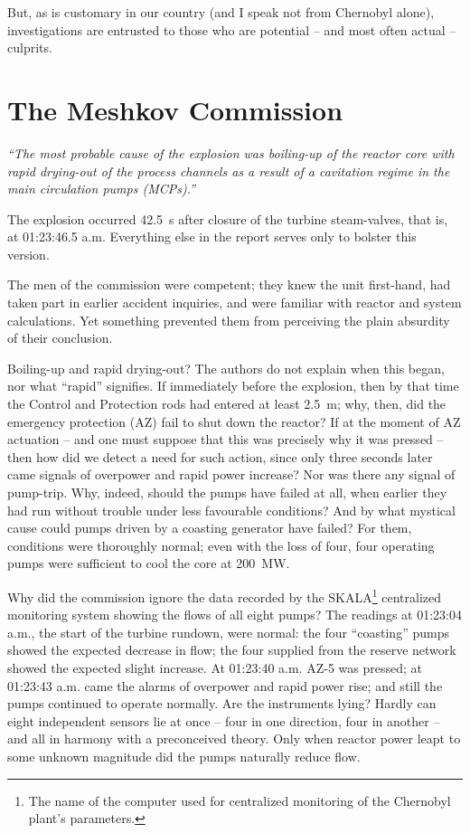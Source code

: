 \documentclass[openright]{bookest}
\begin{document}
But, as is customary in our country (and I speak not from Chernobyl alone), investigations are entrusted to those who are potential -- and most often actual -- culprits.

\section{The Meshkov Commission}

\begin{personal}
\textit{``The most probable cause of the explosion was boiling-up of the reactor core with rapid drying-out of the process channels as a result of a cavitation regime in the main circulation pumps (MCPs).''}
\end{personal}

The explosion occurred \qty{42.5}{\second} after closure of the turbine steam-valves, that is, at 01:23:46.5 a.m. Everything else in the report serves only to bolster this version.

The men of the commission were competent; they knew the unit first-hand, had taken part in earlier accident inquiries, and were familiar with reactor and system calculations. Yet something prevented them from perceiving the plain absurdity of their conclusion.

Boiling-up and rapid drying-out? The authors do not explain when this began, nor what ``rapid'' signifies. If immediately before the explosion, then by that time the Control and Protection rods had entered at least \qty{2.5}{\metre}; why, then, did the emergency protection (AZ) fail to shut down the reactor? If at the moment of AZ actuation -- and one must suppose that this was precisely why it was pressed -- then how did we detect a need for such action, since only three seconds later came signals of overpower and rapid power increase? Nor was there any signal of pump-trip. Why, indeed, should the pumps have failed at all, when earlier they had run without trouble under less favourable conditions? And by what mystical cause could pumps driven by a coasting generator have failed? For them, conditions were thoroughly normal; even with the loss of four, four operating pumps were sufficient to cool the core at \qty{200}{\mega\watt}.

Why did the commission ignore the data recorded by the SKALA\footnote{The name of the computer used for centralized monitoring of the Chernobyl plant's parameters.} centralized monitoring system showing the flows of all eight pumps? The readings at 01:23:04 a.m., the start of the turbine rundown, were normal: the four ``coasting'' pumps showed the expected decrease in flow; the four supplied from the reserve network showed the expected slight increase. At 01:23:40 a.m. AZ-5 was pressed; at 01:23:43 a.m. came the alarms of overpower and rapid power rise; and still the pumps continued to operate normally. Are the instruments lying? Hardly can eight independent sensors lie at once -- four in one direction, four in another -- and all in harmony with a preconceived theory. Only when reactor power leapt to some unknown magnitude did the pumps naturally reduce flow.
\end{document}
